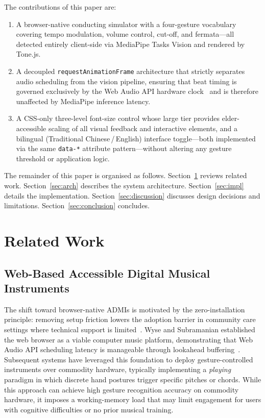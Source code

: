 \documentclass[conference]{IEEEtran}
\begin{document}
The contributions of this paper are:
\begin{enumerate}
  \item A browser-native conducting simulator with a four-gesture
  vocabulary covering tempo modulation, volume control, cut-off, and
  fermata---all detected entirely client-side via MediaPipe Tasks Vision
  and rendered by Tone.js.

  \item A decoupled \texttt{requestAnimationFrame} architecture that
  strictly separates audio scheduling from the vision pipeline, ensuring
  that beat timing is governed exclusively by the Web Audio API hardware
  clock~\cite{rw13} and is therefore unaffected by MediaPipe inference
  latency.

  \item A CSS-only three-level font-size control whose large tier
  provides elder-accessible scaling of all visual feedback and
  interactive elements, and a bilingual (Traditional Chinese\,/\,English)
  interface toggle---both implemented via the same \texttt{data-*}
  attribute pattern---without altering any gesture threshold or
  application logic.
\end{enumerate}

The remainder of this paper is organised as follows.
Section~\ref{sec:related} reviews related work.
Section~\ref{sec:arch} describes the system architecture.
Section~\ref{sec:impl} details the implementation.
Section~\ref{sec:discussion} discusses design decisions and limitations.
Section~\ref{sec:conclusion} concludes.

\section{Related Work}
\label{sec:related}

\subsection{Web-Based Accessible Digital Musical Instruments}

The shift toward browser-native ADMIs is motivated by the
zero-installation principle: removing setup friction lowers the
adoption barrier in community care settings where technical support
is limited~\cite{rw14}. Wyse and Subramanian established the web
browser as a viable computer music platform, demonstrating that Web
Audio API scheduling latency is manageable through lookahead
buffering~\cite{rw14}. Subsequent systems have leveraged this
foundation to deploy gesture-controlled instruments over commodity
hardware, typically implementing a \emph{playing} paradigm in which
discrete hand postures trigger specific pitches or chords. While this
approach can achieve high gesture recognition accuracy on commodity
hardware, it imposes a working-memory load that may limit engagement
for users with cognitive difficulties or no prior musical training.
\end{document}
